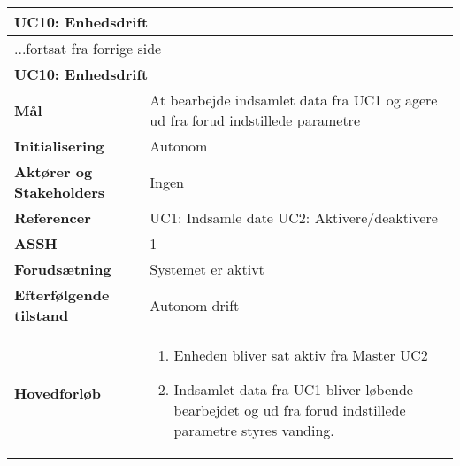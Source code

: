 \begin{center} \centering \label{UC10} 
	\begin{longtable}{|p{5cm}|p{9cm}|}  %
	\hline
		\multicolumn{2}{|l|}{\textbf{UC10: Enhedsdrift}} \\\hline
		\endfirsthead
		
		\multicolumn{2}{l}{...fortsat fra forrige side} \\ \hline %
		\multicolumn{2}{|l|}{\textbf{UC10: Enhedsdrift}} \\\hline 
		\endhead	
		
		\textbf{Mål}								&At bearbejde indsamlet data fra UC1 og agere ud fra forud indstillede parametre 			\\\hline
		\textbf{Initialisering}					&Autonom								\\\hline
		\textbf{Aktører og Stakeholders}			&Ingen								\\\hline
		\textbf{Referencer}						&UC1: Indsamle date 					\newline
												 UC2: Aktivere/deaktivere			\\\hline
		\textbf{ASSH}							&1									\\\hline
		\textbf{Forudsætning}					&Systemet er aktivt					\\\hline
		\textbf{Efterfølgende tilstand}			&Autonom drift						\\\hline
		\textbf{Hovedforløb}					
			&\begin{enumerate}
	
				\item Enheden bliver sat aktiv fra Master UC2
				
				\item Indsamlet data fra UC1 bliver løbende bearbejdet og ud fra forud indstillede parametre styres vanding.
			
			\end{enumerate}\\\hline
	\end{longtable}
\end{center}

